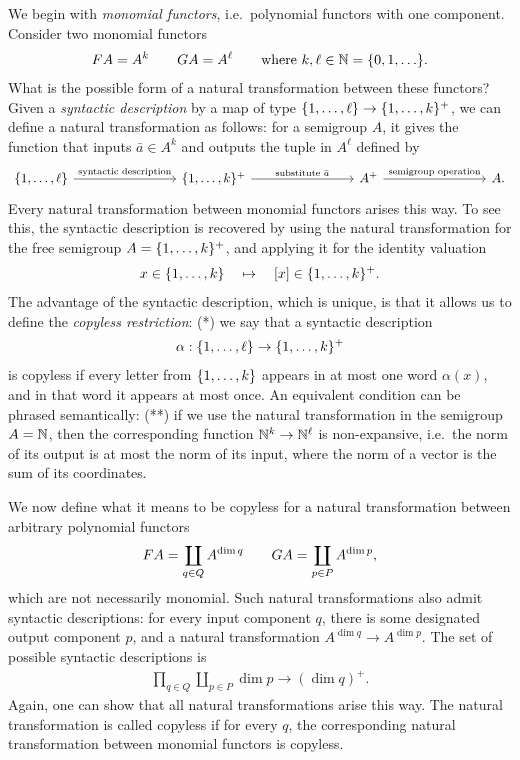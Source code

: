 We begin with \emph{monomial functors}, i.e.~polynomial functors with one component. 
Consider two monomial functors 
\begin{align*}
\functor A = A^k \qquad 
\functorg A = A^\ell \qquad \text{where $k,\ell \in \mathbb{N} = \set{0,1,\ldots}$.}
\end{align*}
What is the possible form of a natural transformation between these functors? Given a \emph{syntactic description} by a map of type
$\{1,\ldots,\ell\} \to \{1,\ldots,k\}^+$,
we can define a natural transformation as follows: for a semigroup $A$, it gives the function  that inputs $\bar a \in A^k$ and outputs the tuple in $A^\ell$ defined by
\[
\begin{tikzcd}
    [column sep=2.8cm]
\set{1,\ldots,\ell}
\arrow[r, "\text{syntactic description}"]
&
\set{1,\ldots,k}^+ 
\ar[r,"\text{substitute $\bar a$}"]
& 
A^+
\ar[r,"\text{semigroup operation}"]
&
A.
\end{tikzcd}
\]
Every natural transformation between monomial functors arises this way. To see this, the syntactic description is recovered by using the natural transformation for the free semigroup $A=\{1,\ldots,k\}^+$, and applying it for the identity valuation 
\begin{align*}
x \in \{1,\ldots,k\} \quad \mapsto \quad [x] \in \{1,\ldots,k\}^+.
\end{align*}
The advantage of the syntactic description, which is unique, is that it allows us to define the  \emph{copyless restriction}:  (*)   we say that a  syntactic description
\begin{align*}
    \alpha: \{1,\ldots,\ell\} \to \{1,\ldots,k\}^+
    \end{align*}
is copyless if  every letter  from $\{1,\ldots,k\}$ appears in at most one word $\alpha(x)$, and in that word it appears at most once. An equivalent condition can be phrased semantically: (**) if we use the natural transformation in the semigroup $A = {\mathbb N}$, then the corresponding function ${\mathbb N}^k \to {\mathbb N}^\ell$ is non-expansive, i.e.\ the norm of its output is at most the norm of its input, where the norm of a vector is the sum of its coordinates. 

We now define what it means to be copyless for a natural transformation between arbitrary polynomial functors 
\begin{align*}
\functor A = \coprod_{q \in Q} A^{\dim q} \qquad 
\functorg A = \coprod_{p \in P} A^{\dim p},
\end{align*}
which are not necessarily monomial. Such natural transformations also admit syntactic descriptions: for every input component $q$, there is some designated output component $p$, and a natural transformation $A^{\dim q} \to A^{\dim p}$.  The set of possible syntactic descriptions is
\begin{align*}
\prod_{q \in Q} \coprod_{p \in P} \dim p \to (\dim q)^+.
\end{align*}
Again, one can show that all natural transformations arise this way. The natural transformation is called copyless if for every $q$, the corresponding natural transformation between monomial functors is copyless. 



